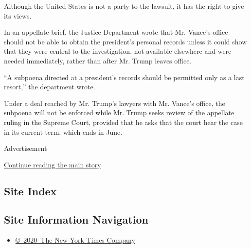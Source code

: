 Although the United States is not a party to the lawsuit, it has the
right to give its views.

In an appellate brief, the Justice Department wrote that Mr. Vance's
office should not be able to obtain the president's personal records
unless it could show that they were central to the investigation, not
available elsewhere and were needed immediately, rather than after Mr.
Trump leaves office.

``A subpoena directed at a president's records should be permitted only
as a last resort,'' the department wrote.

Under a deal reached by Mr. Trump's lawyers with Mr. Vance's office, the
subpoena will not be enforced while Mr. Trump seeks review of the
appellate ruling in the Supreme Court, provided that he asks that the
court hear the case in its current term, which ends in June.

Advertisement

\protect\hyperlink{after-bottom}{Continue reading the main story}

\hypertarget{site-index}{%
\subsection{Site Index}\label{site-index}}

\hypertarget{site-information-navigation}{%
\subsection{Site Information
Navigation}\label{site-information-navigation}}

\begin{itemize}
\tightlist
\item
  \href{https://help.nytimes.com/hc/en-us/articles/115014792127-Copyright-notice}{©~2020~The
  New York Times Company}
\end{itemize}

